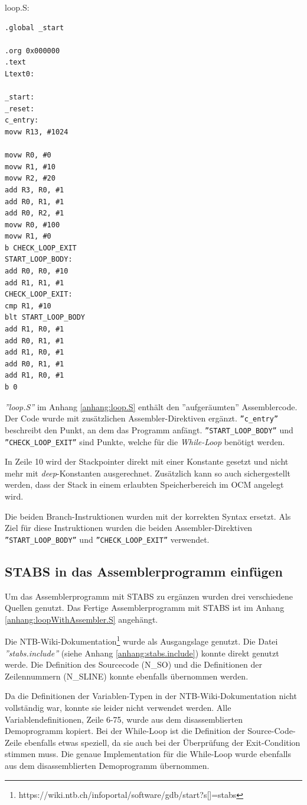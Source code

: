 \FloatBarrier

loop.S:
\begin{lstlisting}
.global _start

.org 0x000000
.text
Ltext0:

_start:
_reset:
c_entry:
movw R13, #1024

movw R0, #0
movw R1, #10
movw R2, #20
add R3, R0, #1
add R0, R1, #1
add R0, R2, #1
movw R0, #100
movw R1, #0
b CHECK_LOOP_EXIT	
START_LOOP_BODY:
add R0, R0, #10
add R1, R1, #1
CHECK_LOOP_EXIT:
cmp R1, #10
blt START_LOOP_BODY
add R1, R0, #1
add R0, R1, #1
add R1, R0, #1
add R0, R1, #1
add R1, R0, #1
b 0
\end{lstlisting}

\textit{''loop.S''} im Anhang \ref{anhang:loop.S} enthält den ''aufgeräumten'' Assemblercode.
Der Code wurde mit zusätzlichen Assembler-Direktiven ergänzt.
\texttt{''c\_entry''} beschreibt den Punkt, an dem das Programm anfängt.
\texttt{''START\_LOOP\_BODY''} und \texttt{''CHECK\_LOOP\_EXIT''} sind Punkte, welche für die \textit{While-Loop} benötigt werden.

In Zeile 10 wird der Stackpointer direkt mit einer Konstante gesetzt und nicht mehr mit \textit{deep}-Konstanten ausgerechnet.
Zusätzlich kann so auch sichergestellt werden, dass der Stack in einem erlaubten Speicherbereich im OCM angelegt wird.

Die beiden Branch-Instruktionen wurden mit der korrekten Syntax ersetzt.
Als Ziel für diese Instruktionen wurden die beiden Assembler-Direktiven \texttt{''START\_LOOP\_BODY''} und \texttt{''CHECK\_LOOP\_EXIT''} verwendet.


\subsection{STABS in das Assemblerprogramm einfügen}
Um das Assemblerprogramm mit STABS zu ergänzen wurden drei verschiedene Quellen genutzt.
Das Fertige Assemblerprogramm mit STABS ist im Anhang \ref{anhang:loopWithAssembler.S} angehängt.

Die NTB-Wiki-Dokumentation\footnote{https://wiki.ntb.ch/infoportal/software/gdb/start?s[]=stabs} wurde als Ausgangslage genutzt.
Die Datei \textit{''stabs.include''} (siehe Anhang \ref{anhang:stabs.include}) konnte direkt genutzt werde.
Die Definition des Sourcecode (N\_SO) und die Definitionen der Zeilennummern (N\_SLINE) konnte ebenfalls übernommen werden.

Da die Definitionen der Variablen-Typen in der NTB-Wiki-Dokumentation nicht vollständig war, konnte sie leider nicht verwendet werden.
Alle Variablendefinitionen, Zeile 6-75, wurde aus dem disassemblierten Demoprogramm kopiert.
Bei der While-Loop ist die Definition der Source-Code-Zeile ebenfalls etwas speziell, da sie auch bei der Überprüfung der Exit-Condition stimmen muss.
Die genaue Implementation für die While-Loop wurde ebenfalls aus dem disassemblierten Demoprogramm übernommen.

